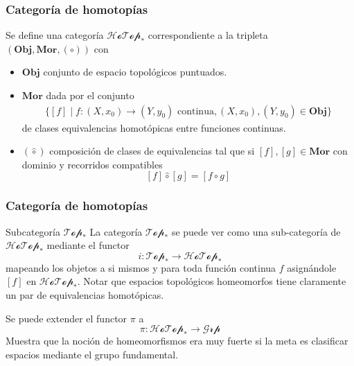 \documentclass[xetex,mathserif,serif]{beamer}
\begin{document}
  \begin{frame}
    \frametitle{Categoría de homotopías}
    Se define una categoría \(\mathscr{HoTop}_*\) correspondiente
    a la tripleta \(\left( \mathbf{Obj}, \mathbf{Mor}, (\circ) \right)\)
    con
    \begin{itemize}
    \item \(\mathbf {Obj}\) conjunto de espacio topológicos puntuados.
    \item \(\mathbf{Mor}\) dada por el conjunto
      \begin{align*}
        \{ [f] \mid f : (X,x_0) \to (Y,y_0) \text{ continua} ,(X,x_0),(Y,y_0) \in \mathbf {Obj}\}
      \end{align*}
      de clases equivalencias homotópicas entre funciones continuas.
    \item \((\hat \circ)\) composición de clases de
      equivalencias tal que si \([f] , [g] \in \mathbf {Mor} \) con
      dominio y recorridos compatibles
      \[ [f] \hat \circ [g] = [f \circ g]\]
    \end{itemize}
  \end{frame}
  \begin{frame}
    \frametitle{Categoría de homotopías}
    \begin{block}{Subcategoría \(\mathscr{Top}_*\)}
      La categoría \(\mathscr{Top}_*\) se puede ver como una
      sub-categoría de \(\mathscr{HoTop}_*\) mediante el functor
      \[ i : \mathscr{Top}_* \to \mathscr{HoTop}_*\]
      mapeando los objetos a si mismos y para toda función continua
      \(f\) asignándole \([f]\) en \(\mathscr{HoTop}_*\).
      Notar que espacios topológicos homeomorfos tiene claramente un par
      de equivalencias homotópicas.

      Se puede extender el functor \(\pi\) a
      \[ \pi : \mathscr{HoTop}_* \to \mathscr{Grp} \]
      Muestra que la noción de homeomorfismos era muy fuerte si la meta
      es clasificar espacios mediante el grupo fundamental.
    \end{block}
  \end{frame}
\end{document}
